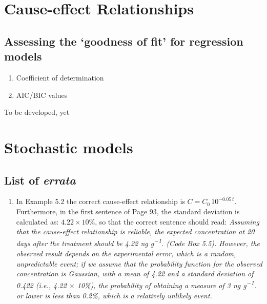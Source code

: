 \documentclass[
  letterpaper,
  DIV=11,
  numbers=noendperiod]{scrreprt}
\providecommand{\tightlist}{%
  \setlength{\itemsep}{0pt}\setlength{\parskip}{0pt}}
\begin{document}

\chapter{Cause-effect Relationships}\label{cause-effect-relationships}

\section{Assessing the `goodness of fit' for regression
models}\label{assessing-the-goodness-of-fit-for-regression-models}

\begin{enumerate}
\def\labelenumi{\arabic{enumi}.}
\tightlist
\item
  Coefficient of determination
\item
  AIC/BIC values
\end{enumerate}

To be developed, yet


\chapter{Stochastic models}\label{stochastic-models}

\section{\texorpdfstring{List of
\emph{errata}}{List of errata}}\label{list-of-errata}

\begin{enumerate}
\def\labelenumi{\arabic{enumi}.}
\tightlist
\item
  In Example 5.2 the correct cause-effect relationship is
  \(C = C_0 \, 10^{−0.05\, t}\). Furthermore, in the first sentence of
  Page 93, the standard deviation is calculated as:
  \(4.22 \times 10\%\), so that the correct sentence should read:
  \emph{Assuming that the cause-effect relationship is reliable, the
  expected concentration at 20 days after the treatment should be 4.22
  ng g\textsuperscript{−1}. (Code Box 5.5). However, the observed result
  depends on the experimental error, which is a random, unpredictable
  event; if we assume that the probability function for the observed
  concentration is Gaussian, with a mean of 4.22 and a standard
  deviation of 0.422 (i.e., 4.22 \(\times\) 10\%), the probability of
  obtaining a measure of 3 ng g\textsuperscript{−1}. or lower is less
  than 0.2\%, which is a relatively unlikely event.}
\end{enumerate}
\end{document}
